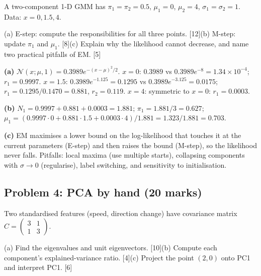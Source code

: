\documentclass[11pt]{article}
\begin{document}
\begin{prob}A two-component 1-D GMM has $\pi_1=\pi_2=0.5$, $\mu_1=0$, $\mu_2=4$, $\sigma_1=\sigma_2=1$. Data: $x=0, 1.5, 4$.

(a) E-step: compute the responsibilities for all three points. [12]\newline (b) M-step: update $\pi_1$ and $\mu_1$. [8]\newline (c) Explain why the likelihood cannot decrease, and name two practical pitfalls of EM. [5]\end{prob}

\begin{soln}\textbf{(a)} $\mathcal N(x;\mu,1)=0.3989e^{-(x-\mu)^2/2}$. $x=0$: $0.3989$ vs $0.3989e^{-8}=1.34\times10^{-4}$; $r_1=\mathbf{0.9997}$. $x=1.5$: $0.3989e^{-1.125}=0.1295$ vs $0.3989e^{-3.125}=0.0175$; $r_1=0.1295/0.1470=\mathbf{0.881}$, $r_2=0.119$. $x=4$: symmetric to $x=0$: $r_1=\mathbf{0.0003}$.

\textbf{(b)} $N_1=0.9997+0.881+0.0003=1.881$; $\pi_1=1.881/3=\mathbf{0.627}$; $\mu_1=(0.9997\cdot0+0.881\cdot1.5+0.0003\cdot4)/1.881=1.323/1.881=\mathbf{0.703}$.

\textbf{(c)} EM maximises a lower bound on the log-likelihood that touches it at the current parameters (E-step) and then raises the bound (M-step), so the likelihood never falls. Pitfalls: local maxima (use multiple starts), collapsing components with $\sigma\to0$ (regularise), label switching, and sensitivity to initialisation.\end{soln}

\subsection{Problem 4: PCA by hand \normalfont\small\color{GreyN}(20 marks)}

\begin{prob}Two standardised features (speed, direction change) have covariance matrix $C=\begin{pmatrix}3&1\\1&3\end{pmatrix}$.

(a) Find the eigenvalues and unit eigenvectors. [10]\newline (b) Compute each component's explained-variance ratio. [4]\newline (c) Project the point $(2,0)$ onto PC1 and interpret PC1. [6]\end{prob}
\end{document}
